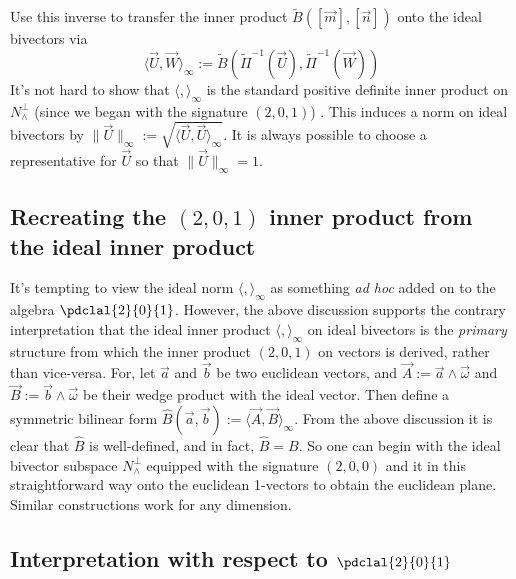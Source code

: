 \documentclass{birkjour}
\begin{document}
Use this inverse to transfer the inner product $\widetilde{B}( [\vec{m}], [\vec{n}])$ onto the ideal bivectors via \[ \langle \vec{U},\vec{W} \rangle_{\infty}  := \widetilde{B}(\widetilde{ \Pi}^{-1}(\vec{U}), \widetilde{\Pi}^{-1}(\vec{W}) )\]   It's not hard to show that $\langle , \rangle_{\infty}$ is the standard positive definite inner product  on $N^{\perp}_{\wedge}$ (since we began with the signature $(2,0,1)$) .  This induces a norm on ideal bivectors by $\| \vec{U} \|_{\infty} := \sqrt{\langle \vec{U}, \vec{U} \rangle_{\infty}}$.  It is always possible to choose a representative for $\vec{U}$ so that $\| \vec{U} \|_{\infty} = 1$. 

\subsection{Recreating the $(2,0,1)$ inner product from the ideal inner product}
\label{sec:eipfromiip}
 It's tempting to view the ideal norm $\langle, \rangle_{\infty}$ as something \emph{ad hoc} added on to the algebra $\pdclal{2}{0}{1}$. However,  the above discussion supports the contrary interpretation that the ideal inner product $\langle, \rangle_{\infty}$ on ideal bivectors is the \emph{primary} structure from which the inner product $(2,0,1)$ on vectors is derived, rather than vice-versa.  For, let $\vec{a}$ and $\vec{b}$ be two euclidean vectors, and $\vec{A} := \vec{a} \wedge \vec{\omega}$ and $\vec{B} := \vec{b} \wedge \vec{\omega}$ be their wedge product with the ideal vector.  Then define a symmetric bilinear form $\widehat{B} (\vec{a}, \vec{b}) := \langle \vec{A}, \vec{B} \rangle_{\infty}$.  From the above discussion it is clear that $\widehat{B}$ is  well-defined, and in fact, $\widehat{B} = B$.  So one can begin with the ideal bivector subspace $N^{\perp}_{\wedge}$ equipped with the signature $(2,0,0)$ and  it in this straightforward way onto the euclidean 1-vectors to obtain the euclidean plane.  Similar constructions work for any dimension.

\subsection{Interpretation with respect to $\pdclal{2}{0}{1}$}
\end{document}
